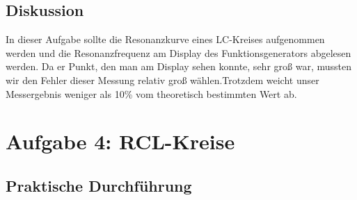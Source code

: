 \documentclass[12pt]{scrartcl}
\begin{document}
\subsection{Diskussion}
In dieser Aufgabe sollte die Resonanzkurve eines LC-Kreises aufgenommen werden und die Resonanzfrequenz am Display des Funktionsgenerators abgelesen werden. Da er Punkt, den man am Display sehen konnte, sehr groß war, mussten wir den Fehler dieser Messung relativ groß wählen.Trotzdem weicht unser Messergebnis weniger als 10\% vom theoretisch bestimmten Wert ab.
\section{Aufgabe 4: RCL-Kreise}
\subsection{Praktische Durchführung}
\end{document}

